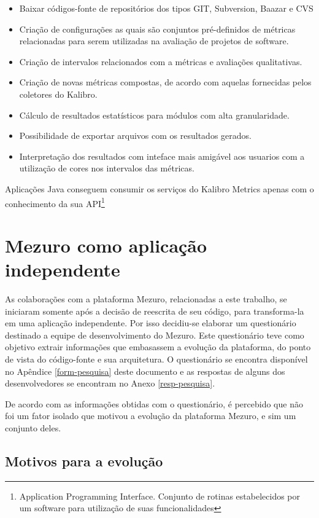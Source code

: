\begin{itemize}
\item Baixar códigos-fonte de repositórios dos tipos GIT, Subversion, Baazar e CVS
\item Criação de configurações as quais são conjuntos pré-definidos de métricas relacionadas para serem utilizadas na avaliação de projetos de software.
\item Criação de intervalos relacionados com a métricas e avaliações qualitativas.
\item Criação de novas métricas compostas, de acordo com aquelas fornecidas pelos coletores do Kalibro.
\item Cálculo de resultados estatísticos para módulos com alta granularidade.
\item Possibilidade de exportar arquivos com os resultados gerados.
\item Interpretação dos resultados com inteface mais amigável aos usuarios com a utilização de cores nos intervalos das métricas.
\end{itemize}

Aplicações Java conseguem consumir os serviços do Kalibro Metrics apenas com o conhecimento da sua API\footnote{Application Programming Interface. Conjunto de rotinas estabelecidos por um software para utilização de suas funcionalidades}

\section{Mezuro como aplicação independente}

As colaborações com a plataforma Mezuro, relacionadas a este trabalho, se iniciaram somente após a decisão de reescrita de seu código, para transforma-la em uma aplicação independente. Por isso decidiu-se elaborar um questionário destinado a equipe de desenvolvimento do Mezuro. Este questionário teve como objetivo extrair informações que embasassem a evolução da plataforma, do ponto de vista do código-fonte e sua arquitetura. O questionário se encontra disponível no Apêndice \ref{form-pesquisa} deste documento e as respostas de alguns dos desenvolvedores se encontram no Anexo \ref{resp-pesquisa}.

De acordo com as informações obtidas com o questionário, é percebido que não foi um fator isolado que motivou a evolução da plataforma Mezuro, e sim um conjunto deles. 

\subsection{Motivos para a evolução}

